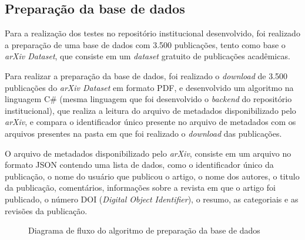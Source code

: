 \subsection{Preparação da base de dados}

Para a realização dos testes no repositório institucional desenvolvido,
foi realizado a preparação de uma base de dados com 3.500 publicações,
tento como base o \emph{arXiv Dataset}, que consiste em um \emph{dataset}
gratuito de publicações acadêmicas.

Para realizar a preparação da base de dados, foi realizado o \emph{download} de
3.500 publicações do \emph{arXiv Dataset} em formato PDF, e desenvolvido um algoritmo
na linguagem C\# (mesma linguagem que foi desenvolvido o \emph{backend} do repositório
institucional), que realiza a leitura do arquivo de metadados disponibilizado pelo \emph{arXiv},
e compara o identificador único presente no arquivo de metadados com os arquivos presentes
na pasta em que foi realizado o \emph{download} das publicações.

O arquivo de metadados disponibilizado pelo \emph{arXiv}, consiste em um arquivo no formato
JSON contendo uma lista de dados, como o identificador único da publicação, o nome do usuário
que publicou o artigo, o nome dos autores, o titulo da publicação, comentários, informações sobre
a revista em que o artigo foi publicado, o número DOI (\emph{Digital Object Identifier}), o resumo,
as categoriais e as revisões da publicação.

\begin{figure}[H]
    \caption{Diagrama de fluxo do algoritmo de preparação da base de dados}
    \centering
    \label{fig:pseudo-algoritmo}
\end{figure}

